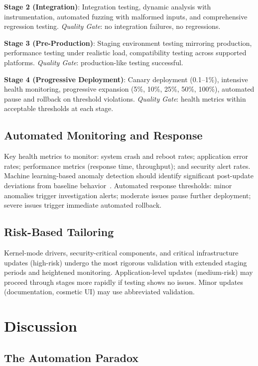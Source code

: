 \documentclass[sigconf,nonacm]{acmart}
\begin{document}
\textbf{Stage 2 (Integration)}: Integration testing, dynamic analysis with instrumentation,
automated fuzzing with malformed inputs, and comprehensive regression testing.
\textit{Quality Gate}: no integration failures, no regressions.

\textbf{Stage 3 (Pre-Production)}: Staging environment testing mirroring production,
performance testing under realistic load, compatibility testing across supported platforms.
\textit{Quality Gate}: production-like testing successful.

\textbf{Stage 4 (Progressive Deployment)}: Canary deployment (0.1--1\%), intensive health
monitoring, progressive expansion (5\%, 10\%, 25\%, 50\%, 100\%), automated pause and
rollback on threshold violations.
\textit{Quality Gate}: health metrics within acceptable thresholds at each stage.

\subsection{Automated Monitoring and Response}

Key health metrics to monitor: system crash and reboot rates; application error rates;
performance metrics (response time, throughput); and security alert rates. Machine
learning-based anomaly detection should identify significant post-update deviations from
baseline behavior~\cite{basiri2021teaching}. Automated response thresholds: minor anomalies
trigger investigation alerts; moderate issues pause further deployment; severe issues
trigger immediate automated rollback.

\subsection{Risk-Based Tailoring}

Kernel-mode drivers, security-critical components, and critical infrastructure updates
(high-risk) undergo the most rigorous validation with extended staging periods and
heightened monitoring. Application-level updates (medium-risk) may proceed through stages
more rapidly if testing shows no issues. Minor updates (documentation, cosmetic UI) may use
abbreviated validation.

\section{Discussion}

\subsection{The Automation Paradox}
\end{document}
